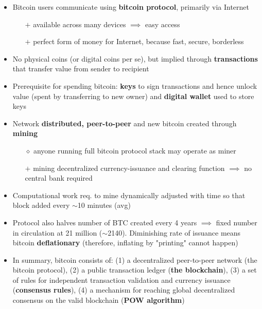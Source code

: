 \documentclass[english, 11pt]{article}
\begin{document}
\begin{itemize}
    \item Bitcoin users communicate using \textbf{bitcoin protocol}, primarily via Internet
    \begin{itemize}
        \item [$+$] available across many devices $\implies$ easy access
        \item [$+$] perfect form of money for Internet, because fast, secure, borderless
    \end{itemize}
    \item No physical coins (or digital coins per se), but implied through \textbf{transactions} that transfer value from sender to recipient
    \item Prerequisite for spending bitcoin: \textbf{keys} to sign transactions and hence unlock value (spent by transferring to new owner) and \textbf{digital wallet} used to store keys
    \item Network \textbf{distributed, peer-to-peer} and new bitcoin created through \textbf{mining}
    \begin{itemize}
        \item [$\diamond$] anyone running full bitcoin protocol stack may operate as miner
        \item [$+$] mining decentralized currency-issuance and clearing function $\implies$ no central bank required
    \end{itemize}
    \item Computational work req. to mine dynamically adjusted with time so that block added every $\sim$10 minutes (avg)
    \item Protocol also halves number of BTC created every 4 years $\implies$ fixed number in circulation at 21 million ($\sim$2140). Diminishing rate of issuance means bitcoin \textbf{deflationary} (therefore, inflating by "printing" cannot happen)
    \item In summary, bitcoin consists of: (1) a decentralized peer-to-peer network (the bitcoin protocol), (2) a public transaction ledger (\textbf{the blockchain}), (3) a set of rules for independent transaction validation and currency issuance (\textbf{consensus rules}), (4) a mechanism for reaching global decentralized consensus on the valid blockchain (\textbf{POW algorithm})
\end{itemize}
\end{document}
